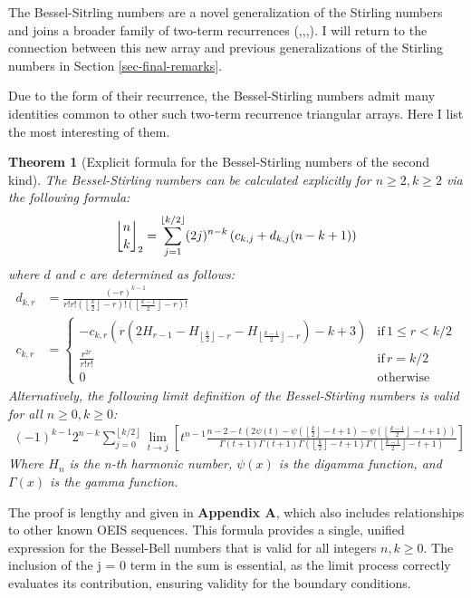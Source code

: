 \documentclass[a4paper]{amsart}
\newcommand{\mStirling}[0]{\genfrac{\lfloor}{\rfloor}{0pt}{}}
\newcommand{\floor}[1]{\left\lfloor #1 \right\rfloor}
\newtheorem{theorem}{Theorem}
\begin{document}
The Bessel-Sitrling numbers are a novel generalization of the Stirling numbers and joins a broader family of two-term recurrences (\cite{mansour_general_2012},\cite{neuwirth_recursively_2001},\cite{barbero_g_bivariate_2014},\cite{spiveySolutionsGeneralCombinatorial2011}). I will return to the connection between this new array and previous generalizations of the Stirling numbers in Section \ref{sec-final-remarks}.

Due to the form of their recurrence, the Bessel-Stirling numbers admit many identities common to other such two-term recurrence triangular arrays. Here I list the most interesting of them.

\begin{theorem}[Explicit formula for the Bessel-Stirling numbers of the second kind]\label{thm-bs-formula}
The Bessel-Stirling numbers can be calculated explicitly for $n \ge 2, k \geq 2$ via  the following formula:
\[
    \mStirling{n}{k}_2 = \sum_{j=1}^{\floor{k/2}}(2j)^{n-k}\left (c_{k,j} +d_{k,j}(n-k+1) \right )
\]
where $d$ and $c$ are determined as follows:
\[
\begin{aligned}
    d_{k,r} &= \frac{(-r)^{k-1}}{r!r!(\floor{\frac{k}{2}}-r)!(\floor{\frac{k-1}{2}}-r)!} \\
    c_{k,r} &= \begin{cases}
                - c_{k,r} (r(2H_{r-1}-H_{\floor{\frac{k}{2}}-r}-H_{\floor{\frac{k-1}{2}}-r})-k+3) & \text{if} \, 1 \leq r < k/2\\
                \frac{r^{2r}}{r!r!} & \text{if}  \, r = k/2\\
                0 & \text{otherwise}
            \end{cases} 
\end{aligned}
\]
Alternatively, the following limit definition of the Bessel-Stirling numbers is valid for all $n\ge0, k\ge 0$:
$$
\begin{aligned}
    (-1)^{k-1} 2^{n-k} \sum_{j=0}^{\floor{k/2}} \lim_{t \to j} \left[t^{n-1}
        \frac
            {n-2-t\,\left(2\psi(t)-\psi\left(\floor{\frac{k}{2}}-t+1\right)-\psi\left(\floor{\frac{k-1}{2}}-t+1\right)\right)}
            {\Gamma(t+1) \Gamma(t+1) \Gamma(\floor{\frac{k}{2}}-t+1) \Gamma(\floor{\frac{k-1}{2}}-t+1)}\right]
\end{aligned}
$$
Where $H_n$ is the n-th harmonic number, $\psi(x)$ is the digamma function, and $\Gamma(x)$ is the gamma function. 
\end{theorem}
The proof is lengthy and given in \textbf{Appendix A}, which also includes relationships to other known OEIS sequences. This formula provides a single, unified expression for the Bessel-Bell numbers that is valid for all integers $n, k \ge 0$. The inclusion of the j = 0 term in the sum is essential, as the limit process correctly evaluates its contribution, ensuring validity for the boundary conditions.
\end{document}
